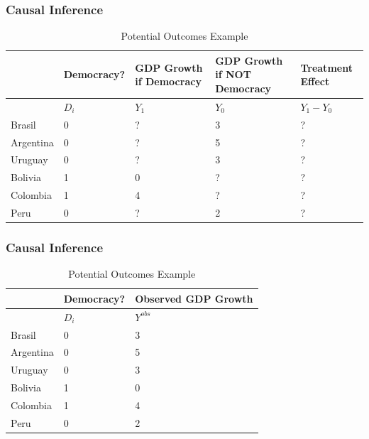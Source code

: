 \documentclass[xcolor=x11names,compress]{beamer}\usepackage[]{graphicx}\usepackage[]{xcolor}
\renewcommand{\(}{\begin{columns}}
\renewcommand{\)}{\end{columns}}
\newcommand{\<}[1]{\begin{column}{#1}}
\renewcommand{\>}{\end{column}}
\begin{document}
\begin{frame}
\frametitle{Causal Inference}
\footnotesize
\begin{table}[htbp]
  \centering
  \caption{Potential Outcomes Example}
    \begin{tabular}{|p{1.8cm}|p{1.8cm}|p{2cm}|p{2cm}|p{2cm}|}
    \hline
          & \multicolumn{1}{p{1.8cm}|}{Democracy?} & \multicolumn{1}{p{2cm}|}{GDP Growth if Democracy} & \multicolumn{1}{p{2.2cm}|}{GDP Growth if NOT Democracy} & Treatment Effect \bigstrut\\
    \hline
          & \multicolumn{1}{p{1.8cm}|}{$D_i$} & \multicolumn{1}{p{2cm}|}{$Y_1$} & \multicolumn{1}{p{2.2cm}|}{$Y_0$} & \multicolumn{1}{p{1.8cm}|}{$Y_{1} - Y_{0}$} \bigstrut\\
    \hline
    Brasil & 0 & ?     & 3     & ? \bigstrut\\
    \hline
    Argentina & 0 & ?    & 5     & ? \bigstrut\\
    \hline
    Uruguay & 0 & ? & 3 & ?  \bigstrut\\
    \hline
    Bolivia & 1  & 0     & ?     & ? \bigstrut\\
    \hline
    Colombia & 1  & 4    & ?    & ? \bigstrut\\
    \hline
    Peru & 0 & ?     & 2     & ? \bigstrut\\
\hline
    \end{tabular}%
  \label{tab:addlabel}%
\end{table}%
\normalsize
\end{frame}

\begin{frame}
\frametitle{Causal Inference}
\footnotesize
\begin{table}[htbp]
  \centering
  \caption{Potential Outcomes Example}
    \begin{tabular}{|p{1.8cm}|p{1.8cm}|p{2cm}|}
    \hline
          & \multicolumn{1}{p{1.8cm}|}{Democracy?} & \textbf{Observed} GDP Growth \bigstrut\\
    \hline
          & \multicolumn{1}{p{1.8cm}|}{$D_i$} & \multicolumn{1}{p{1.8cm}|}{$Y^{obs}$} \bigstrut\\
    \hline
    Brasil & 0 & 3 \bigstrut\\
    \hline
    Argentina & 0      & 5 \bigstrut\\
    \hline
    Uruguay & 0 & 3  \bigstrut\\
    \hline
    Bolivia & 1      & 0 \bigstrut\\
    \hline
    Colombia & 1    & 4 \bigstrut\\
    \hline
    Peru & 0 & 2 \bigstrut\\
    \hline
    \end{tabular}%
  \label{tab:addlabel}%
\end{table}%
\normalsize
\end{frame}
\end{document}
